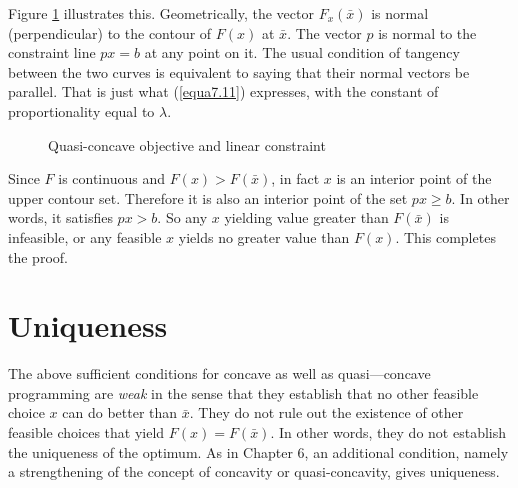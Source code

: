 Figure \ref{Fig7.4} illustrates this. Geometrically, the vector $F_x(\bar{x})$ is normal (perpendicular) to the contour of $F(x)$ at $\bar{x}$. The vector $p$ is normal to the constraint line $px =b $ at any point on it. The usual condition of tangency between the two curves is equivalent to saying that their normal vectors be parallel. That is just what (\ref{equa7.11}) expresses, with the constant of proportionality equal to $\lambda$.
\begin{figure}[!htb] %
\centering %
\caption{Quasi-concave objective and linear constraint} %
\label{Fig7.4} %
\end{figure}

Since $F$ is continuous and $F(x) > F(\bar{x})$, in fact $x$ is an interior point of the upper contour set. Therefore it is also an interior point of the set $px \geq b$. In other words, it satisfies $px >b$. So any $x$ yielding value greater than $F(\bar{x})$ is infeasible, or any feasible $x$ yields no greater value than $F(x)$. This completes the proof.

\section*{Uniqueness}

The above sufficient conditions for concave as well as quasi—concave programming are \textit{weak} in the sense that they establish that no other feasible choice $x$ can do better than $\bar{x}$. They do not rule out the existence of other feasible choices that yield $F(x) = F(\bar{x})$. In
other words, they do not establish the uniqueness of the optimum. As in Chapter 6, an additional condition, namely a strengthening of the concept of concavity or quasi-concavity, gives uniqueness.

